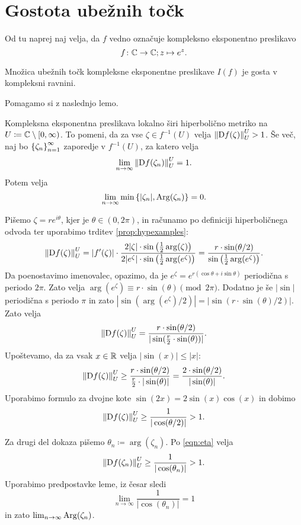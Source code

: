 \section{Gostota ubežnih točk}

\noindent Od tu naprej naj velja, da \(f\) vedno označuje kompleksno eksponentno preslikavo
\[f \colon \mathbb C \to \mathbb C; z \mapsto e^{z}.\]

\begin{izrek} \label{thm:escapingdense}
    Množica ubežnih točk kompleksne eksponentne preslikave \(I (f)\) je gosta v kompleksni ravnini.
\end{izrek}

\noindent Pomagamo si z naslednjo lemo.

\begin{lema} \label{lem:hyper}
    Kompleksna eksponentna preslikava lokalno širi hiperbolično metriko na \(U \coloneq \mathbb C \setminus [0, \infty)\). To pomeni, da za vse \(\zeta \in f^{-1} (U)\) velja
    \(\left\| \mathrm{D} f (\zeta) \right\|_{U}^{U} > 1\). Še več, naj bo \(\left\{ \zeta_n \right\}_{n = 1}^{\infty}\) zaporedje v \(f^{-1} (U)\), za katero velja \[\lim_{n \to \infty} \left\| \mathrm{D} f (\zeta_n) \right\|_{U}^{U} = 1.\] Potem velja
    \[\lim_{n \to \infty} \min \left\{ |\zeta_n|, \operatorname{Arg} (\zeta_n) \right\} = 0.\]
\end{lema}

\begin{dokaz}
    Pišemo \(\zeta = r e^{i \theta}\), kjer je \(\theta \in (0, 2 \pi)\), in računamo po definiciji hiperboličnega odvoda ter uporabimo trditev \ref{prop:hypexamples}:
    \[
        \left\| \mathrm{D} f (\zeta) \right\|_{U}^{U} = |f' (\zeta)| \cdot \frac{2 |\zeta| \cdot \sin \left( \frac{1}{2} \arg (\zeta) \right)}{2 |e^{\zeta}| \cdot \sin \left( \frac{1}{2} \arg (e^{\zeta}) \right)}
        =
        \frac{r \cdot \sin (\theta / 2)}{\sin \left( \frac{1}{2} \arg (e^{\zeta}) \right)}.    
    \]
    Da poenostavimo imenovalec, opazimo, da je \(e^{\zeta} = e^{r (\cos \theta + i \sin \theta)}\) periodična s periodo \(2 \pi\). Zato velja \(\arg (e^{\zeta}) \equiv r \cdot \sin (\theta) \pmod{2 \pi}\). Dodatno je še \(|\sin|\) periodična s periodo \(\pi\) in zato \(|\sin (\arg (e^{\zeta}) / 2)| = |\sin (r \cdot \sin (\theta) / 2)|\). Zato velja
    \[\left\| \mathrm{D} f (\zeta) \right\|_{U}^{U} = \frac{r \cdot \sin (\theta / 2)}{|\sin (\frac{r}{2} \cdot \sin (\theta))|}.\]
    Upoštevamo, da za vsak \(x \in \mathbb R\) velja \(|\sin (x)| \leq |x|\):
    \[\left\| \mathrm{D} f (\zeta) \right\|_{U}^{U} \geq \frac{r \cdot \sin (\theta / 2)}{\frac{r}{2} \cdot |\sin (\theta)|} = \frac{2 \cdot \sin (\theta / 2)}{|\sin (\theta)|}.\]
    Uporabimo formulo za dvojne kote \(\sin (2 x) = 2 \sin (x) \cos (x)\) in dobimo
    \begin{equation} \label{eqn:eta}
        \left\| \mathrm{D} f (\zeta) \right\|_{U}^{U} \geq \frac{1}{|\cos (\theta / 2)|} > 1.
    \end{equation}

    \noindent Za drugi del dokaza pišemo \(\theta_n \coloneq \arg (\zeta_n)\). Po \eqref{eqn:eta} velja
    \[\left\| \mathrm{D} f (\zeta_n) \right\|_{U}^{U} \geq \frac{1}{|\cos (\theta_n)|} > 1.\]
    Uporabimo predpostavke leme, iz česar sledi
    \[\lim_{n \to \infty} \frac{1}{|\cos (\theta_n)|} = 1\]
    in zato \(\lim_{n \to \infty} \operatorname{Arg} (\zeta_n)\).
\end{dokaz}

